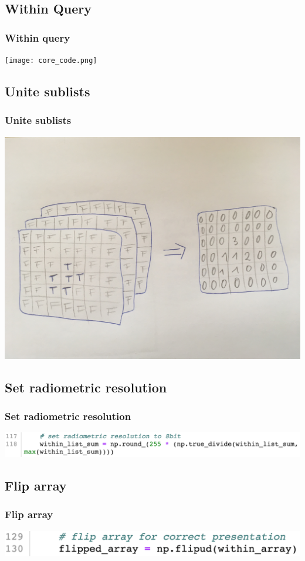 \documentclass[12pt]{beamer}
\begin{document}
\subsection{Within Query}

\begin{frame}\frametitle{Within query}

\texttt{[image: core\_code.png]}
\end{frame}


\subsection{Unite sublists}

\begin{frame}\frametitle{Unite sublists}
\hspace{0.5cm} 
\includegraphics[scale=0.06]{IMG_5504.JPG}
\end{frame}

\subsection{Set radiometric resolution}
\begin{frame}\frametitle{Set radiometric resolution}
\includegraphics[scale=0.26]{radiometric.png}
\end{frame}

\subsection{Flip array}
\begin{frame}\frametitle{Flip array}
\hspace{0cm} 
\includegraphics[scale=0.3]{flip.png}
\end{frame}
\end{document}
